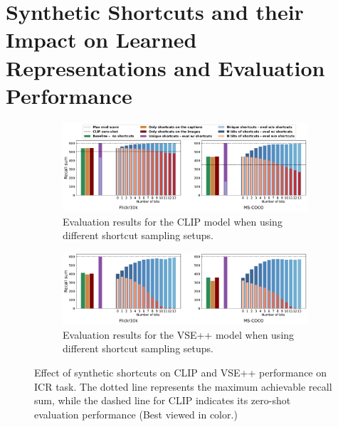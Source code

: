 \section{Synthetic Shortcuts and their Impact on Learned Representations and Evaluation Performance}
\label{eval:results}

\begin{figure}[t!]
\centering
\begin{subfigure}[b]{\textwidth}
	\includegraphics[width=1\linewidth]{figures/results/CLIP-f30k-coco-shortcut-eval-linear.pdf}
	\vspace*{-6mm}
	\caption{Evaluation results for the CLIP model when using different shortcut sampling setups. }
	\label{fig:results_clip}
\end{subfigure}

\vspace*{4mm}
\begin{subfigure}[b]{\textwidth}
	\includegraphics[width=1\linewidth]{figures/results/VSE-f30k-coco-shortcut-eval-linear.pdf}
	\vspace*{-6mm}
	\caption{Evaluation results for the VSE++ model when using different shortcut sampling setups. }
	\label{fig:results_vse} 
\end{subfigure}
\caption{Effect of synthetic shortcuts on CLIP and VSE++ performance on \ac{ICR} task.
The dotted line represents the maximum achievable recall sum, while the dashed line for CLIP indicates its zero-shot evaluation performance
(Best viewed in color.)}
\label{fig:shortcuts_results}
\end{figure}


